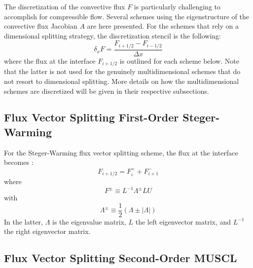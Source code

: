\documentclass{warpdoc}
\begin{document}
The discretization of the convective flux $F$ is particularly challenging to accomplish for compressible flow. Several schemes using the eigenstructure of the convective flux Jacobian $A$ are here presented. For the schemes that rely on a dimensional splitting strategy, the discretization stencil is the following:
%
\begin{equation}
\delta_x F = \frac{F_{i+1/2}-F_{i-1/2}}{\Delta x}
\end{equation}
%
where the flux at the interface $F_{i+1/2}$ is outlined for each scheme below. Note that the latter is not used for the genuinely multidimensional schemes that do not resort to dimensional splitting. More details on how the multidimensional schemes are discretized will be given in their respective subsections.   


\subsection{Flux Vector Splitting First-Order Steger-Warming}


For the Steger-Warming flux vector splitting scheme, the flux at the interface becomes \cite{jcp:1981:steger}:
%
\begin{equation}
F_{i+1/2}=F^+_{i}
         +F^-_{i+1}
\label{eqn:FVS_1o}
\end{equation}
%
where 
%
\begin{equation}
F^\pm \equiv  L^{-1} \Lambda^\pm L U
\label{eqn:Fplusminus}
\end{equation}
%
with 
%
\begin{equation}
\Lambda^\pm \equiv \frac{1}{2}(\Lambda\pm|\Lambda|)
\label{eqn:Lambdaplusminus}
\end{equation}
%
In the latter, $\Lambda$ is the eigenvalue matrix, $L$  the left eigenvector matrix, and $L^{-1}$ the right eigenvector matrix.




\subsection{Flux Vector Splitting Second-Order MUSCL}
\end{document}
